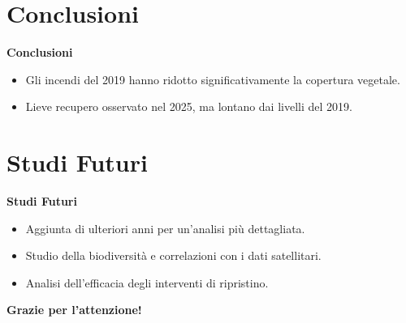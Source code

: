 \documentclass{beamer}
\begin{document}
\section{Conclusioni}

\begin{frame}{\textbf{Conclusioni}}
\begin{itemize}
    \item Gli incendi del 2019 hanno ridotto significativamente la copertura vegetale.
    \item Lieve recupero osservato nel 2025, ma lontano dai livelli del 2019.
\end{itemize}
\end{frame}

\section{Studi Futuri}

\begin{frame}{\textbf{Studi Futuri}}
\begin{itemize}
    \item Aggiunta di ulteriori anni per un'analisi più dettagliata.
    \item Studio della biodiversità e correlazioni con i dati satellitari.
    \item Analisi dell'efficacia degli interventi di ripristino.
\end{itemize}
\end{frame}

\begin{frame}{}
\centering
\textbf{Grazie per l'attenzione!}
\end{frame}
\end{document}

